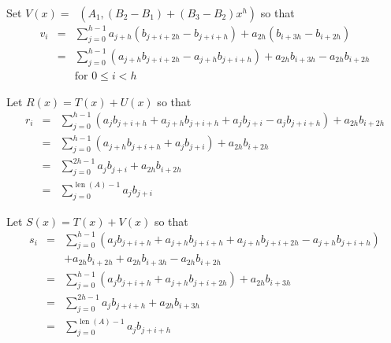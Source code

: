 \documentclass{article}
\DeclareMathOperator{\len}{len}
\DeclareMathOperator{\mult}{mul^{T}}
\begin{document}
Set $V(x) = \mult(A_1, (B_2 - B_1) + (B_3 - B_2) x^h)$ 
so that
\begin{eqnarray*}
v_i & = & \sum_{j=0}^{h-1} a_{j+h} (b_{j+i+2h} - b_{j+i+h}) + a_{2h}(b_{i+3h} - b_{i+2h})\\
    & = & \sum_{j=0}^{h-1} (a_{j+h} b_{j+i+2h} - a_{j+h} b_{j+i+h}) + a_{2h} b_{i+3h} - a_{2h} b_{i+2h}\\
& & \textrm{for } 0\leq i < h
\end{eqnarray*}

Let $R(x) = T(x) + U(x)$ so that
\begin{eqnarray*}
r_i & = & \sum_{j=0}^{h-1} (a_j b_{j+i+h} + a_{j+h} b_{j+i+h} + a_j b_{j+i} - a_j b_{j+i+h}) + a_{2h} b_{i+2h} \\
    & = & \sum_{j=0}^{h-1} (a_{j+h} b_{j+i+h} + a_j b_{j+i}) + a_{2h} b_{i+2h} \\
    & = & \sum_{j=0}^{2h-1} a_j b_{j+i} + a_{2h} b_{i+2h} \\
    & = & \sum_{j=0}^{\len(A)-1} a_j b_{j+i}
\end{eqnarray*}

Let $S(x) = T(x) + V(x)$ so that
\begin{eqnarray*}
s_i & = & \sum_{j=0}^{h-1} (a_j b_{j+i+h} + a_{j+h} b_{j+i+h} + a_{j+h} b_{j+i+2h} - a_{j+h} b_{j+i+h}) \\
    &   &+ a_{2h} b_{i+2h} + a_{2h} b_{i+3h} - a_{2h} b_{i+2h}\\
    & = & \sum_{j=0}^{h-1} (a_j b_{j+i+h} + a_{j+h} b_{j+i+2h}) + a_{2h} b_{i+3h} \\
    & = & \sum_{j=0}^{2h-1} a_j b_{j+i+h} + a_{2h} b_{i+3h} \\
    & = & \sum_{j=0}^{\len(A)-1} a_j b_{j+i+h}
\end{eqnarray*}
\end{document}
